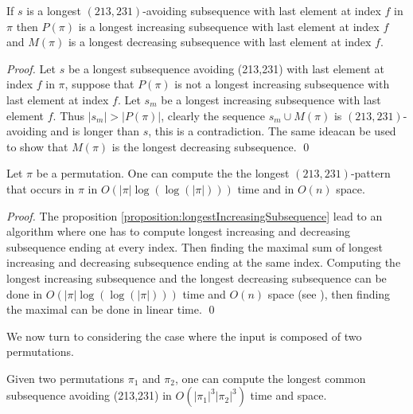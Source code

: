 \documentclass[a4paper]{llncs}
\newcommand{\ptext}{\pi}
\newcounter{num}
\begin{document}
	\begin{proposition}
	\label{proposition:longestIncreasingSubsequence}
	If $s$ is a longest $(213,231)$-avoiding subsequence with last element at index 
	$f$ in $\pi$ then
	$P(\pi)$ is a longest increasing subsequence with last element at index $f$ and
	$M(\pi)$ is a longest decreasing subsequence with last element at index $f$.
	\end{proposition}

	\begin{proof}
	Let $s$ be a longest subsequence avoiding (213,231) with last element at index $f$ in $\pi$,
	suppose that $P(\pi)$ is not a longest increasing subsequence with last element at index $f$. Let $s_m$ be a longest increasing subsequence with last element $f$.
	Thus $|s_m|>|P(\pi)|$, clearly the sequence $s_m \cup M(\pi)$
	is $(213,231)$-avoiding and is longer than $s$, this is a contradiction.
	The same ideacan be used to show that $M(\pi)$ is the longest decreasing subsequence.
	\qed
	\end{proof}

	\begin{proposition}
	Let $\pi$ be a permutation. One can compute the
	the longest $(213,231)$-pattern that occurs in $\pi$
	in $O(|\ptext|\log(\log(|\ptext|)))$ time and in $O(n)$ space.
	\end{proposition}

	\begin{proof}
	The proposition \ref{proposition:longestIncreasingSubsequence} lead to an algorithm
	where one has to compute longest increasing and decreasing subsequence ending at every index. Then finding the maximal sum of longest increasing and decreasing subsequence ending at the same index.
	Computing the longest increasing subsequence and the longest decreasing subsequence can be done in 
	$O(|\ptext|\log(\log(|\ptext|)))$ time and $O(n)$ space 
	(see \cite{Bespamyatnikh00enumeratinglongest}), 
	then finding the maximal can be done in linear time.
	\qed
	\end{proof}

We now turn to considering the case where the input is composed of two permutations.

\begin{proposition}
Given two permutations $\pi_1$ and $\pi_2$,
one can compute 
the longest common subsequence
avoiding (213,231) in $O(|\pi_1|^3|\pi_2|^3)$ time and space.
\end{proposition}
\end{document}
